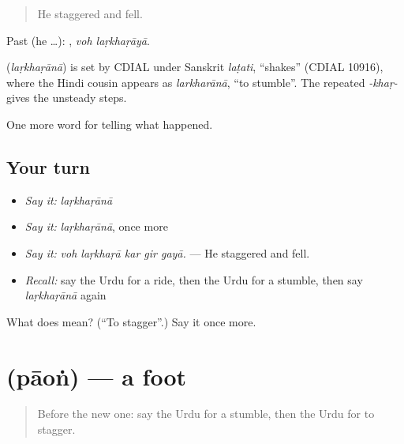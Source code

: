 \begin{quote}
He staggered and fell.
\end{quote}

Past (he …):  , \emph{voh laṛkhaṛāyā}.

\begin{cousinweb}
\textbf{} (\emph{laṛkhaṛānā}) is set by CDIAL under Sanskrit \emph{laṭati}, \textquotedblleft{}shakes\textquotedblright{} (CDIAL 10916), where the Hindi cousin appears as \emph{larkharānā}, \textquotedblleft{}to stumble\textquotedblright{}. The repeated \emph{-khaṛ-} gives the unsteady steps.
\end{cousinweb}

\begin{grammarlens}[title={What you've built}]
One more word for telling what happened.
\end{grammarlens}

\subsection*{Your turn}
\begin{itemize}
\raggedright
  \item \emph{Say it:} \emph{laṛkhaṛānā}
  \item \emph{Say it:} \emph{laṛkhaṛānā}, once more
  \item \emph{Say it:} \emph{voh laṛkhaṛā kar gir gayā.} — He staggered and fell.
  \item \emph{Recall:} say the Urdu for a ride, then the Urdu for a stumble, then say \emph{laṛkhaṛānā} again
\end{itemize}

\begin{tcolorbox}[breakable,colback=teal!4,colframe=teal!35!black,title={Before you move on}]
What does  mean? (\textquotedblleft{}To stagger\textquotedblright{}.) Say it once more.
\end{tcolorbox}
\section[\texorpdfstring{\ur{پاؤں} (pāoṅ)}{پاؤں (pāoṅ)}]{ (pāoṅ) — a foot}

\label{lesson:UR-C285-paon}



\begin{quote}
Before the new one: say the Urdu for a stumble, then the Urdu for to stagger.
\end{quote}

